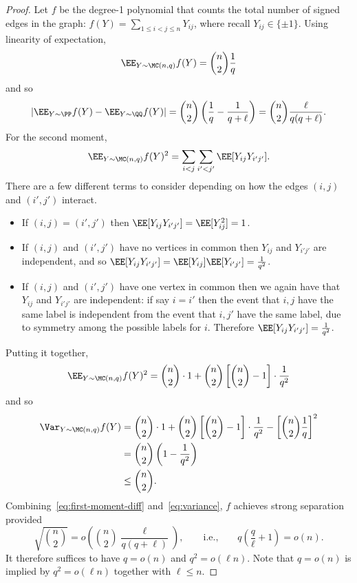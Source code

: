 \documentclass{article}
\begin{document}
\begin{proof}
Let $f$ be the degree-1 polynomial that counts the total number of signed edges in the graph: $f(Y) = \sum_{1 \le i < j \le n} Y_{ij}$, where recall $Y_{ij} \in \{\pm 1\}$. Using linearity of expectation,
\[ \EE_{Y \sim \MC(n,q)} f(Y) = \binom{n}{2} \frac{1}{q} \]
and so
\begin{equation}\label{eq:first-moment-diff}
\left|\EE_{Y \sim \PP} f(Y) - \EE_{Y \sim \QQ} f(Y)\right| = \binom{n}{2}\left(\frac{1}{q} - \frac{1}{q+\ell}\right) = \binom{n}{2} \frac{\ell}{q(q+\ell)}.
\end{equation}
For the second moment,
\[ \EE_{Y \sim \MC(n,q)} f(Y)^2 = \sum_{i < j} \sum_{i' < j'} \EE[Y_{ij} Y_{i'j'}]. \]
There are a few different terms to consider depending on how the edges $(i,j)$ and $(i',j')$ interact.
\begin{itemize}
\item If $(i,j) = (i',j')$ then $\EE[Y_{ij}Y_{i'j'}] = \EE[Y_{ij}^2] = 1$.
\item If $(i,j)$ and $(i',j')$ have no vertices in common then $Y_{ij}$ and $Y_{i'j'}$ are independent, and so $\EE[Y_{ij}Y_{i'j'}] = \EE[Y_{ij}]\EE[Y_{i'j'}] = \frac{1}{q^2}$.
\item If $(i,j)$ and $(i',j')$ have one vertex in common then we again have that $Y_{ij}$ and $Y_{i'j'}$ are independent: if say $i = i'$ then the event that $i,j$ have the same label is independent from the event that $i,j'$ have the same label, due to symmetry among the possible labels for $i$. Therefore $\EE[Y_{ij}Y_{i'j'}] = \frac{1}{q^2}$.
\end{itemize}
Putting it together,
\[ \EE_{Y \sim \MC(n,q)} f(Y)^2 = \binom{n}{2} \cdot 1 + \binom{n}{2}\left[\binom{n}{2}-1\right] \cdot \frac{1}{q^2} \]
and so
\begin{align}
\Var_{Y \sim \MC(n,q)} f(Y) &= \binom{n}{2} \cdot 1 + \binom{n}{2}\left[\binom{n}{2}-1\right] \cdot \frac{1}{q^2} - \left[\binom{n}{2} \frac{1}{q}\right]^2 \nonumber \\
&= \binom{n}{2}\left(1 - \frac{1}{q^2}\right) \nonumber \\
&\le \binom{n}{2}.
\label{eq:variance}
\end{align}
Combining~\eqref{eq:first-moment-diff} and~\eqref{eq:variance}, $f$ achieves strong separation provided
\[ \sqrt{\binom{n}{2}} = o\left(\binom{n}{2} \frac{\ell}{q(q+\ell)}\right), \qquad \text{i.e.,} \qquad q\left(\frac{q}{\ell}+1\right) = o(n). \]
It therefore suffices to have $q = o(n)$ and $q^2 = o(\ell n)$. Note that $q=o(n)$ is implied by $q^2 = o(\ell n)$ together with $\ell \le n$.
\end{proof}
\end{document}
